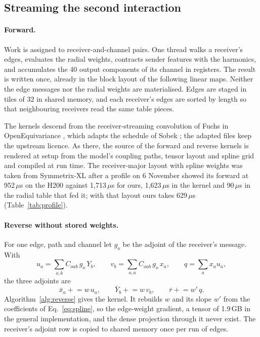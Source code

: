 \documentclass[11pt]{article}
\newcommand{\us}{\,\ensuremath{\mu}s}
\begin{document}
\subsection{Streaming the second interaction}
\label{sec:conv}

\paragraph{Forward.}
Work is assigned to receiver-and-channel pairs. One thread walks a receiver's edges, evaluates the radial
weights, contracts sender features with the harmonics, and accumulates the 40 output components of its channel
in registers. The result is written once, already in the block layout of the following linear maps. Neither the
edge messages nor the radial weights are materialised. Edges are staged in tiles of 32 in shared memory, and each
receiver's edges are sorted by length so that neighbouring receivers read the same table pieces.

The kernels descend from the receiver-streaming convolution of Fuchs \cite{fuchs2026oeqpr223} in
OpenEquivariance \cite{bharadwaj2025oeq}, which adapts the schedule of Sobek \cite{chorosajev2026sobek}; the
adapted files keep the upstream licence. As there, the source of the forward and reverse kernels is rendered at
setup from the model's coupling paths, tensor layout and spline grid and compiled at run time. The receiver-major layout with spline weights was taken from
Symmetrix-XL after a profile on 6 November showed its forward at 952\us{} on the H200 against 1{,}713\us{} for
ours, 1{,}623\us{} in the kernel and 90\us{} in the radial table that fed it; with that layout ours takes
629\us{} (Table~\ref{tab:profile}).

\paragraph{Reverse without stored weights.}
For one edge, path and channel let $g_o$ be the adjoint of the receiver's message. With
\begin{equation}
u_a = \sum_{o,b} C_{oab}\, g_o\, Y_b, \qquad
v_b = \sum_{o,a} C_{oab}\, g_o\, x_a, \qquad
q = \sum_a x_a u_a ,
\end{equation}
the three adjoints are
\begin{equation}
\bar x_a \mathrel{+}= w\,u_a, \qquad \bar Y_b \mathrel{+}= w\,v_b, \qquad \bar r \mathrel{+}= w'\,q .
\end{equation}
Algorithm~\ref{alg:reverse} gives the kernel. It rebuilds $w$ and its slope $w'$ from the coefficients of
Eq.~\eqref{eq:spline}, so the edge-weight gradient, a tensor of 1.9\,GB in the general implementation, and the
dense projection through it never exist. The receiver's adjoint row is copied to shared memory once per run of
edges.
\end{document}
